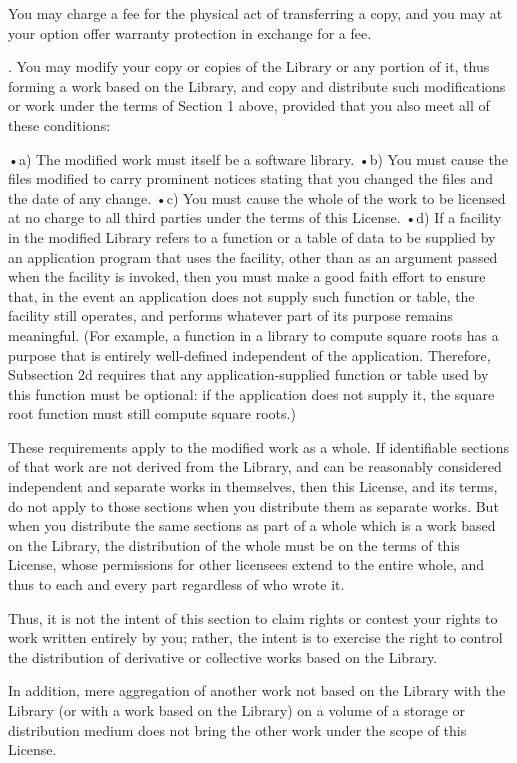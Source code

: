 You may charge a fee for the physical act of transferring a copy, and you may at your option offer warranty protection in exchange for a fee. 

. You may modify your copy or copies of the Library or any portion of it, thus forming a work based on the Library, and copy and distribute such modifications or work under the terms of Section 1 above, provided that you also meet all of these conditions: 

•a) The modified work must itself be a software library. 
•b) You must cause the files modified to carry prominent notices stating that you changed the files and the date of any change. 
•c) You must cause the whole of the work to be licensed at no charge to all third parties under the terms of this License. 
•d) If a facility in the modified Library refers to a function or a table of data to be supplied by an application program that uses the facility, other than as an argument passed when the facility is invoked, then you must make a good faith effort to ensure that, in the event an application does not supply such function or table, the facility still operates, and performs whatever part of its purpose remains meaningful. 
(For example, a function in a library to compute square roots has a purpose that is entirely well-defined independent of the application. Therefore, Subsection 2d requires that any application-supplied function or table used by this function must be optional: if the application does not supply it, the square root function must still compute square roots.)

These requirements apply to the modified work as a whole. If identifiable sections of that work are not derived from the Library, and can be reasonably considered independent and separate works in themselves, then this License, and its terms, do not apply to those sections when you distribute them as separate works. But when you distribute the same sections as part of a whole which is a work based on the Library, the distribution of the whole must be on the terms of this License, whose permissions for other licensees extend to the entire whole, and thus to each and every part regardless of who wrote it. 

Thus, it is not the intent of this section to claim rights or contest your rights to work written entirely by you; rather, the intent is to exercise the right to control the distribution of derivative or collective works based on the Library. 

In addition, mere aggregation of another work not based on the Library with the Library (or with a work based on the Library) on a volume of a storage or distribution medium does not bring the other work under the scope of this License. 

